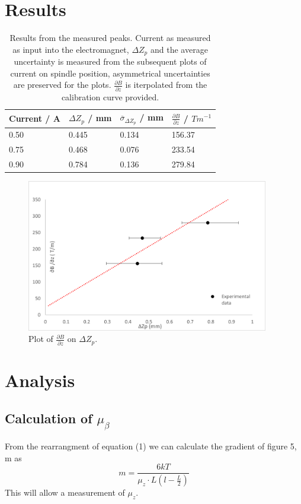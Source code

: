 \documentclass{article}%
\begin{document}
\section{Results}
\begin{table}[H]
    \begin{centering}
    \begin{tabular}{|p{3cm}||p{3cm}|p{3cm}|p{3cm}|} 
        \hline
        Current / A & $\Delta Z_{p}$ / mm & $\overline{\sigma}_{\Delta Z_{p}}$ / mm & $\frac{\partial B}{\partial z}$ / $Tm^{-1}$ \\ [0.75ex] 
        \hline\hline
        0.50 & 0.445 & 0.134 & 156.37 \\ 
        \hline
        0.75 & 0.468 & 0.076 & 233.54 \\
        \hline
        0.90 & 0.784 & 0.136 &  279.84 \\
        \hline
    \end{tabular}
    \caption{Results from the measured peaks. Current as measured as input into the electromagnet, $\Delta Z_{p}$ and the average uncertainty is measured from the subsequent plots of current on spindle position, asymmetrical uncertainties are preserved for the plots. $\frac{\partial B}{\partial z}$ is iterpolated from the calibration curve provided. }
\end{centering}
\end{table}

\begin{figure}[H]%
    \centering%
    \includegraphics[width=400px]{graph_1.png}
    \caption{Plot of $\frac{\partial B}{\partial z}$ on $\Delta Z_{p}$.}%
\end{figure}

\section{Analysis}
\subsection{Calculation of $\mu_{\beta}$}
From the rearrangment of equation (1) we can calculate the gradient of figure 5, m as 
$$
    m = \frac{6kT}{\mu_z \cdot L(l - \frac{L}{2})}
$$
This will allow a measurement of $\mu_z$.
\end{document}
